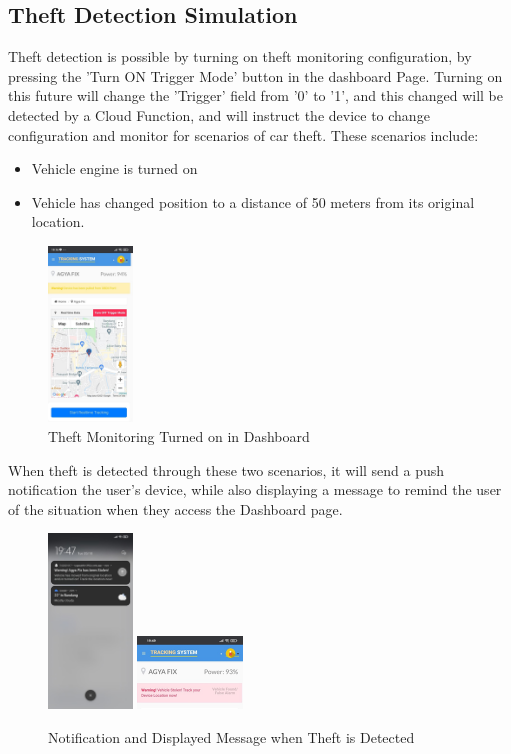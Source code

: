 \documentclass[conference]{IEEEtran}
\begin{document}
\subsection{Theft Detection Simulation}
Theft detection is possible by turning on theft monitoring configuration, by pressing the 'Turn ON Trigger Mode' button in the dashboard Page. Turning on this future will change the 'Trigger' field from '0' to '1', and this changed will be detected by a Cloud Function, and will instruct the device to change configuration and monitor for scenarios of car theft. These scenarios include:
\begin{itemize}
\item Vehicle engine is turned on
\item Vehicle has changed position to a distance of 50 meters from its original location.
\end{itemize}
\begin{figure}[htbp]
    \centering
    \includegraphics[width=0.2\textwidth]{triggeron}
    \caption{Theft Monitoring Turned on in Dashboard}
    \label{fig1}
\end{figure}
When theft is detected through these two scenarios, it will send a push notification the user's device, while also displaying a message to remind the user of the situation when they access the Dashboard page.
\begin{figure}[htbp]
    \centering
    \includegraphics[width=0.2\textwidth]{notif1}
    \includegraphics[width=0.25\textwidth]{notif2}
    \caption{Notification and Displayed Message when Theft is Detected}
    \label{fig1}
\end{figure}
\end{document}
